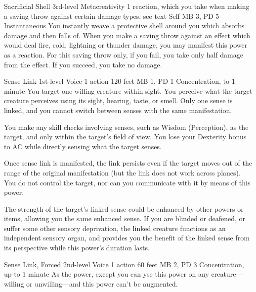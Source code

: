 \DndPowerHeader%
  {Sacrificial Shell}
  {3rd-level Metacreativity}
  {1 reaction, which you take when making a saving throw
    against certain damage types, see text}
  {Self}
  {MB 3, PD 5}
  {Instantaneous}
You instantly weave a protective shell around you
which absorbs damage and then falls of.
When you make a saving throw against an effect
which would deal fire, cold, lightning or thunder damage,
you may manifest this power as a reaction.
For this saving throw only,
if you fail, you take only half damage from the effect.
If you succeed, you take no damage.

\DndPowerHeader%
  {Sense Link}
  {1st-level Voice}
  {1 action}
  {120 feet}
  {MB 1, PD 1}
  {Concentration, to 1 minute}
  You target one willing creature within sight.
  You perceive what the target creature perceives using its sight,
  hearing, taste, or smell.
  Only one sense is linked,
  and you cannot switch between senses with the same manifestation.

  You make any skill checks involving senses,
  such as Wisdom (Perception), as the target,
  and only within the target's field of view.
  You lose your Dexterity bonus to AC while
  directly sensing what the target senses.
  
  Once sense link is manifested, the link persists
  even if the target moves out of the range
  of the original manifestation
  (but the link does not work across planes).
  You do not control the target,
  nor can you communicate with it by means of this power.
  
  The strength of the target's linked sense could be enhanced
  by other powers or items,
  allowing you the same enhanced sense.
  If you are blinded or deafened, or suffer some other sensory deprivation,
  the linked creature functions as an independent sensory organ,
  and provides you the benefit of the linked sense from its perspective
  while this power's duration lasts.

\DndPowerHeader%
  {Sense Link, Forced}
  {2nd-level Voice}
  {1 action}
  {60 feet}
  {MB 2, PD 3}
  {Concentration, up to 1 minute}
As the  power,
except you can yse this power on any creature---willing or
unwilling---and this power can't be augmented.

